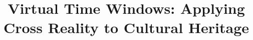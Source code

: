 \documentclass{sig-alternate}
\begin{document}
%






\title{Virtual Time Windows: Applying Cross Reality to Cultural Heritage}


%
%
%
%
%
\end{document}
